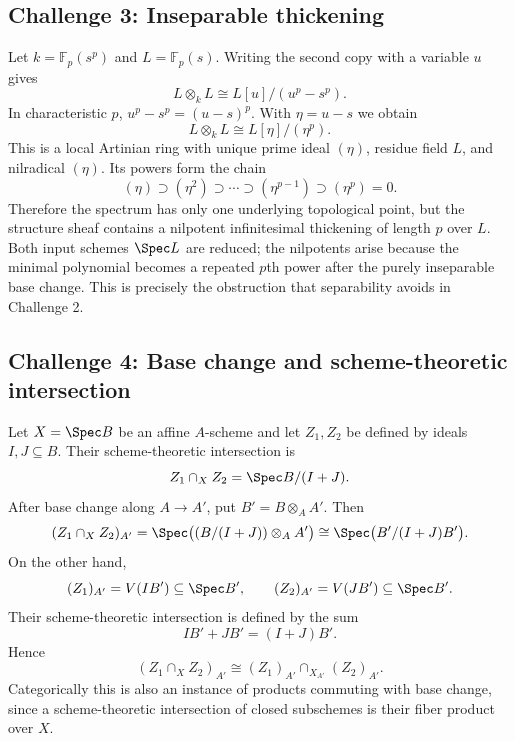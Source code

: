 \subsection*{Challenge 3: Inseparable thickening}
\begin{solution}
Let $k=\mathbb F_p(s^p)$ and $L=\mathbb F_p(s)$.  Writing the second copy with a variable $u$ gives
\[
L\otimes_kL\cong L[u]/(u^p-s^p).
\]
In characteristic $p$, $u^p-s^p=(u-s)^p$.  With $\eta=u-s$ we obtain
\[
L\otimes_kL\cong L[\eta]/(\eta^p).
\]
This is a local Artinian ring with unique prime ideal $(\eta)$, residue field $L$, and nilradical $(\eta)$.  Its powers form the chain
\[
(\eta)\supset(\eta^2)\supset\cdots\supset(\eta^{p-1})\supset(\eta^p)=0.
\]
Therefore the spectrum has only one underlying topological point, but the structure sheaf contains a nilpotent infinitesimal thickening of length $p$ over $L$.  Both input schemes $\Spec L$ are reduced; the nilpotents arise because the minimal polynomial becomes a repeated $p$th power after the purely inseparable base change.  This is precisely the obstruction that separability avoids in Challenge 2.
\end{solution}

\subsection*{Challenge 4: Base change and scheme-theoretic intersection}
\begin{solution}
Let $X=\Spec B$ be an affine $A$-scheme and let $Z_1,Z_2$ be defined by ideals $I,J\subseteq B$.  Their scheme-theoretic intersection is
\[
Z_1\cap_X Z_2=\Spec B/(I+J).
\]
After base change along $A\to A'$, put $B'=B\otimes_AA'$.  Then
\[
(Z_1\cap_XZ_2)_{A'}
=\Spec\bigl((B/(I+J))\otimes_AA'\bigr)
\cong\Spec\bigl(B'/(I+J)B'\bigr).
\]
On the other hand,
\[
(Z_1)_{A'}=V(IB')\subseteq\Spec B',\qquad
(Z_2)_{A'}=V(JB')\subseteq\Spec B'.
\]
Their scheme-theoretic intersection is defined by the sum
\[
IB'+JB'=(I+J)B'.
\]
Hence
\[
(Z_1\cap_XZ_2)_{A'}\cong (Z_1)_{A'}\cap_{X_{A'}}(Z_2)_{A'}.
\]
Categorically this is also an instance of products commuting with base change, since a scheme-theoretic intersection of closed subschemes is their fiber product over $X$.
\end{solution}

